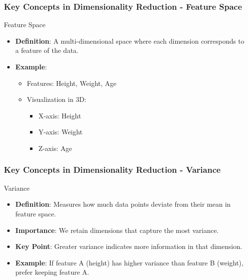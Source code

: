 \documentclass[aspectratio=169]{beamer}
\begin{document}
\begin{frame}[fragile]
    \frametitle{Key Concepts in Dimensionality Reduction - Feature Space}
    \begin{block}{Feature Space}
        \begin{itemize}
            \item \textbf{Definition}: A multi-dimensional space where each dimension corresponds to a feature of the data.
            \item \textbf{Example}: 
                \begin{itemize}
                    \item Features: Height, Weight, Age
                    \item Visualization in 3D: 
                        \begin{itemize}
                            \item X-axis: Height
                            \item Y-axis: Weight
                            \item Z-axis: Age
                        \end{itemize}
                \end{itemize}
        \end{itemize}
    \end{block}
\end{frame}

\begin{frame}[fragile]
    \frametitle{Key Concepts in Dimensionality Reduction - Variance}
    \begin{block}{Variance}
        \begin{itemize}
            \item \textbf{Definition}: Measures how much data points deviate from their mean in feature space.
            \item \textbf{Importance}: We retain dimensions that capture the most variance.
            \item \textbf{Key Point}: Greater variance indicates more information in that dimension.
            \item \textbf{Example}: If feature A (height) has higher variance than feature B (weight), prefer keeping feature A.
        \end{itemize}
    \end{block}
\end{frame}
\end{document}
